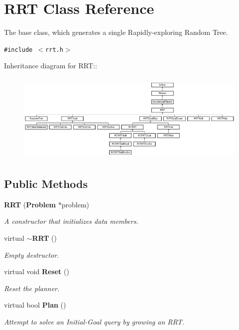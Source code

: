 \section{RRT  Class Reference}
\label{classRRT}
The base class, which generates a single Rapidly-exploring Random Tree. 


{\tt \#include $<$rrt.h$>$}

Inheritance diagram for RRT::\begin{figure}[H]
\begin{center}
\leavevmode
\includegraphics[height=4.34109cm]{classRRT}
\end{center}
\end{figure}
\subsection*{Public Methods}
\begin{CompactItemize}
\item 
{\bf RRT} ({\bf Problem} $\ast$problem)
\begin{CompactList}\small\item\em A constructor that initializes data members.\item\end{CompactList}\item 
virtual {\bf $\sim$RRT} ()
\begin{CompactList}\small\item\em Empty destructor.\item\end{CompactList}\item 
virtual void {\bf Reset} ()
\begin{CompactList}\small\item\em Reset the planner.\item\end{CompactList}\item 
virtual bool {\bf Plan} ()
\begin{CompactList}\small\item\em Attempt to solve an Initial-Goal query by growing an RRT.\item\end{CompactList}\end{CompactItemize}
